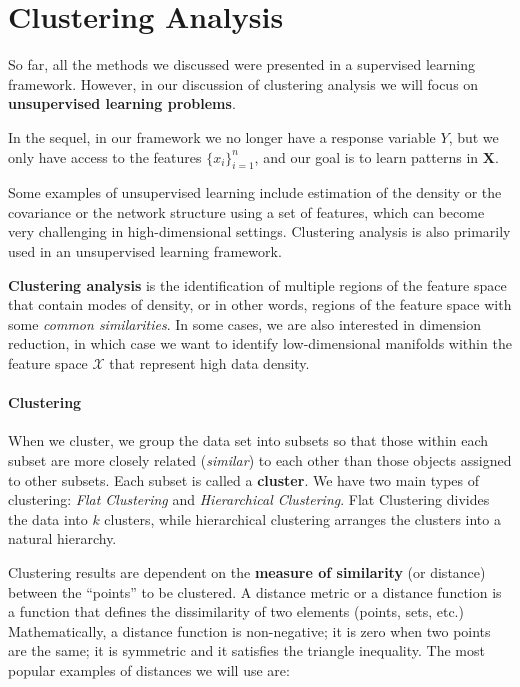 \documentclass[
]{book}
\begin{document}
\chapter{Clustering Analysis}\label{clustering-analysis}

So far, all the methods we discussed were presented in a supervised learning framework. However, in our discussion of clustering analysis we will focus on \textbf{unsupervised learning problems}.

In the sequel, in our framework we no longer have a response variable \(Y\), but we only have access to the features \(\{x_i\}_{i=1}^{n}\), and our goal is to learn patterns in \(\textbf{X}\).

Some examples of unsupervised learning include estimation of the density or the covariance or the network structure using a set of features, which can become very challenging in high-dimensional settings. Clustering analysis is also primarily used in an unsupervised learning framework.

\textbf{Clustering analysis} is the identification of multiple regions of the feature space that contain modes of density, or in other words, regions of the feature space with some \emph{common similarities}. In some cases, we are also interested in dimension reduction, in which case we want to identify low-dimensional manifolds within the feature space \(\mathcal{X}\) that represent high data density.

\subsubsection*{Clustering}\label{clustering}

When we cluster, we group the data set into subsets so that those within each subset are more closely related (\emph{similar}) to each other than those objects assigned to other subsets. Each subset is called a \textbf{cluster}. We have two main types of clustering: \emph{Flat Clustering} and \emph{Hierarchical Clustering}. Flat Clustering divides the data into \(k\) clusters, while hierarchical clustering arranges the clusters into a natural hierarchy.

Clustering results are dependent on the \textbf{measure of similarity} (or distance) between the ``points'' to be clustered. A distance metric or a distance function is a function that defines the dissimilarity of two elements (points, sets, etc.) Mathematically, a distance function is non-negative; it is zero when two points are the same; it is symmetric and it satisfies the triangle inequality. The most popular examples of distances we will use are:
\end{document}
